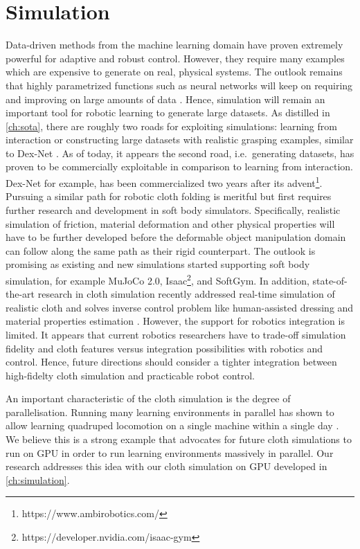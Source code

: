 \documentclass[\home/main.tex]{subfiles}
\begin{document}
\section{Simulation} \label{sec:towards_sim}
Data-driven methods from the machine learning domain have proven extremely powerful for adaptive and robust control. However, they require many examples which are expensive to generate on real, physical systems. The outlook remains that highly parametrized functions such as neural networks will keep on requiring and improving on large amounts of data \autocite{sun2017revisiting}. Hence, simulation will remain an important tool for robotic learning to generate large datasets. As distilled in \cref{ch:sota}, there are roughly two roads for exploiting simulations: learning from interaction or constructing large datasets with realistic grasping examples, similar to Dex-Net \autocite{dexnet2}. As of today, it appears the second road, i.e.\ generating datasets, has proven to be commercially exploitable in comparison to learning from interaction. Dex-Net for example, has been commercialized two years after its advent\footnote{https://www.ambirobotics.com/}. Pursuing a similar path for robotic cloth folding is meritful but first requires further research and development in soft body simulators. Specifically,
realistic simulation of friction, material deformation and other physical properties will have to be further developed before the deformable object manipulation domain can follow along the same path as their rigid counterpart. The outlook is promising as  existing and new simulations started supporting soft body simulation, for example MuJoCo 2.0, Isaac\footnote{https://developer.nvidia.com/isaac-gym}, and SoftGym. In addition, state-of-the-art research in cloth simulation recently addressed real-time simulation of realistic cloth and solves inverse control problem like human-assisted dressing and material properties estimation \autocite{Junbang2019,li2021diffcloth}. However, the support for robotics integration is limited. It appears that current robotics researchers have to trade-off simulation fidelity and cloth features versus integration possibilities with robotics and control. Hence, future directions should consider a tighter integration between high-fidelty cloth simulation and practicable robot control.

An important characteristic of the cloth simulation is the degree of parallelisation. Running many learning environments in parallel has shown to allow learning quadruped locomotion on a single machine within a single day \autocite{rudin2021learning}. We believe this is a strong example that advocates for future cloth simulations to run on GPU in order to run learning environments massively in parallel. Our research addresses this idea with our cloth simulation on \gls{GPU} developed in \cref{ch:simulation}.    
\end{document}
